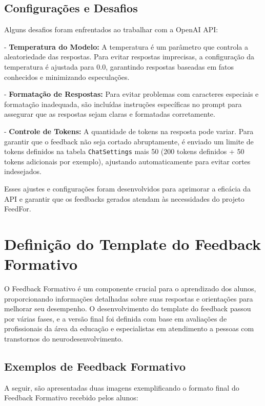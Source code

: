 \subsection{Configurações e Desafios}

Alguns desafios foram enfrentados ao trabalhar com a OpenAI API:

- \textbf{Temperatura do Modelo:} A temperatura é um parâmetro que controla a aleatoriedade das respostas. Para evitar respostas imprecisas, a configuração da temperatura é ajustada para 0.0, garantindo respostas baseadas em fatos conhecidos e minimizando especulações.

- \textbf{Formatação de Respostas:} Para evitar problemas com caracteres especiais e formatação inadequada, são incluídas instruções específicas no prompt para assegurar que as respostas sejam claras e formatadas corretamente.

- \textbf{Controle de Tokens:} A quantidade de tokens na resposta pode variar. Para garantir que o feedback não seja cortado abruptamente, é enviado um limite de tokens definidos na tabela \texttt{ChatSettings} mais 50 (200 tokens definidos + 50 tokens adicionais por exemplo), ajustando automaticamente para evitar cortes indesejados.

Esses ajustes e configurações foram desenvolvidos para aprimorar a eficácia da API e garantir que os feedbacks gerados atendam às necessidades do projeto FeedFor.

\section{Definição do Template do Feedback Formativo}

O Feedback Formativo é um componente crucial para o aprendizado dos alunos, proporcionando informações detalhadas sobre suas respostas e orientações para melhorar seu desempenho. O desenvolvimento do template do feedback passou por várias fases, e a versão final foi definida com base em avaliações de profissionais da área da educação e especialistas em atendimento a pessoas com transtornos do neurodesenvolvimento.

\subsection{Exemplos de Feedback Formativo}

A seguir, são apresentadas duas imagens exemplificando o formato final do Feedback Formativo recebido pelos alunos:

